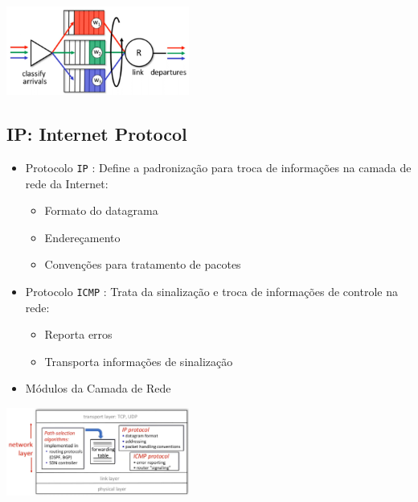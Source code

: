 \begin{itemize}[left=0.5cm, align=left, nosep]
                    \begin{center}
                        \includegraphics[width=0.45\textwidth]{img/cap-04/wfq.png}
                    \end{center}
            
            \end{itemize} 

    \subsection{IP: Internet Protocol}
    
        \begin{itemize}[left=0.5cm, align=left, nosep]
            \item Protocolo \texttt{IP} : Define a padronização para troca de informações na camada de rede da Internet:
            \begin{itemize}[left=0.5cm, nosep, label=$\hookrightarrow$]
                \item Formato do datagrama
                \item Endereçamento
                \item Convenções para tratamento de pacotes
            \end{itemize}
            \item Protocolo \texttt{ICMP} : Trata da sinalização e troca de informações de controle na rede:
            \begin{itemize}[left=0.5cm, nosep, label=$\hookrightarrow$]
                \item Reporta erros
                \item Transporta informações de sinalização
            \end{itemize}
        \end{itemize}


        \begin{itemize}[left=0.5cm, align=left, nosep]
            \item Módulos da Camada de Rede
        \end{itemize}

        \begin{center}
            \includegraphics[width=0.45\textwidth]{img/cap-04/modulos-camada-de-rede.png}
        \end{center}

